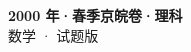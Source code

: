 \documentclass[zihao=-4, a4paper]{ctexart}
\begin{document}
\begin{center}
  {\Large\bfseries 2000 年·春季京皖卷·理科}\\[4pt]
  {\large 数学 · 试题版}
\end{center}
\medskip
{}

\end{document}
